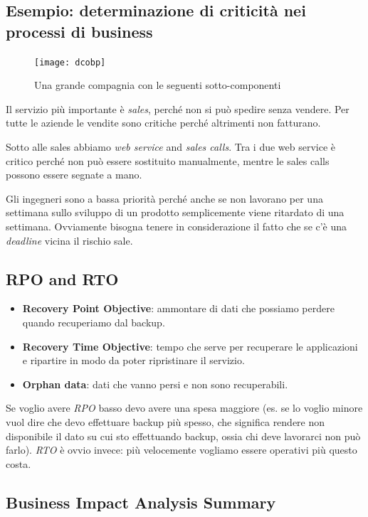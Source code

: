 \subsection{Esempio: determinazione di criticità nei processi di business}

\begin{figure}[H]
 \centering
 \texttt{[image: dcobp]}
 \caption{Una grande compagnia con le seguenti sotto-componenti}
\end{figure}

Il servizio più importante è \textit{sales}, perché non si può spedire senza
vendere. Per tutte le aziende le vendite sono critiche perché altrimenti non
fatturano.

Sotto alle sales abbiamo \textit{web service} and \textit{sales calls}. Tra i
due web service è critico perché non può essere sostituito manualmente, mentre
le sales calls possono essere segnate a mano.

Gli ingegneri sono a bassa priorità perché anche se non lavorano per una
settimana sullo sviluppo di un prodotto semplicemente viene ritardato di una
settimana. Ovviamente bisogna tenere in considerazione il fatto che se c'è una
\textit{deadline} vicina il rischio sale.

\subsection{RPO and RTO}

\begin{itemize}
 \item \textbf{Recovery Point Objective}: ammontare di dati che possiamo
perdere quando recuperiamo dal backup.

 \item \textbf{Recovery Time Objective}: tempo che serve per recuperare le
applicazioni e ripartire in modo da poter ripristinare il servizio.

 \item \textbf{Orphan data}: dati che vanno persi e non sono recuperabili.
\end{itemize}

Se voglio avere \textit{RPO} basso devo avere una spesa maggiore (es. se lo
voglio minore vuol dire che devo effettuare backup più spesso, che significa
rendere non disponibile il dato su cui sto effettuando backup, ossia chi deve
lavorarci non può farlo).
\textit{RTO} è ovvio invece: più velocemente vogliamo essere operativi più
questo costa.

\subsection{Business Impact Analysis Summary}

